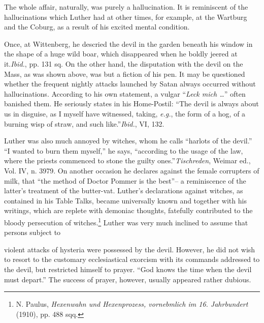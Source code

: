 The whole affair, naturally, was purely a hallucination. It is
reminiscent of the hallucinations which Luther had at other times, for
example, at the Wartburg and the Coburg, as a result of his excited
mental condition.

Once, at Wittenberg, he descried the devil in the garden beneath
his window in the shape of a huge wild boar, which disappeared when
he boldly jeered at it.\textit{Ibid.}, pp. 131 sq.
 On the other hand, the disputation with the
devil on the Mass, as was shown above, was but a fiction of his pen.
It may be questioned whether the frequent nightly attacks launched
by Satan always occurred without hallucinations. According to his
own statement, a vulgar “\textit{Leck mich \dots}” often banished them. He
seriously states in his Home-Postil: “The devil is always about us in
disguise, as I myself have witnessed, taking, \textit{e.g.}, the form of a hog, of
a burning wisp of straw, and such like.”\textit{Ibid.}, VI, 132.


Luther was also much annoyed by witches, whom he calls “harlots of the
devil.” “I wanted to burn them myself,” he says, “according to the usage
of the law, where the priests commenced to stone the
guilty ones.”\textit{Tischreden}, Weimar ed., Vol. IV, n. 3979.
 On another occasion he declares against the female
corrupters of milk, that “the method of Doctor Pommer is the best”--
a reminiscence of the latter’s treatment of the butter-vat. Luther’s
declarations against witches, as contained in his Table Talks, became
universally known and together with his writings, which are replete
with demoniac thoughts, fatefully contributed to the bloody persecution
of witches.\footnote
{N. Paulus, \textit{Hexenwahn und Hexenprozess, vornebmlich im 16. Jahrbundert} (1910),
pp. 488 sqq.}
Luther was very much inclined to assume that persons subject to

violent attacks of hysteria were possessed by the devil. However, he
did not wish to resort to the customary ecclesiastical exorcism with
its commands addressed to the devil, but restricted himself to prayer.
“God knows the time when the devil must depart.” The success of
prayer, however, usually appeared rather dubious.

